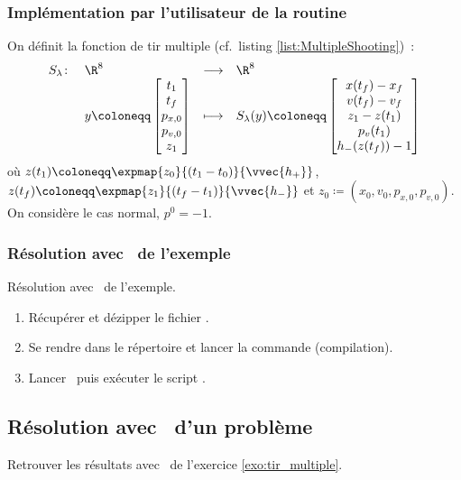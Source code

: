 \subsubsection{Impl\'ementation par l'utilisateur de la routine \fortran\ }
On d\'efinit la fonction de tir multiple (cf.\ listing \ref{list:MultipleShooting})~:
\begin{equation*}
    \begin{array}{rlcl}
        S_{\lambda} \colon & \R^8 & \longrightarrow   & \R^8 \\
        & y\coloneqq \begin{bmatrix}
            t_1     \\
            t_f     \\
            p_{x,0} \\
            p_{v,0} \\
            z_1
        \end{bmatrix}
        & \longmapsto       & \displaystyle S_{\lambda}(y) \coloneqq 
        \begin{bmatrix}
            x(t_f)  - x_f       \\
            v(t_f)  - v_f       \\
            z_1     - z(t_1)    \\
            p_v(t_1)            \\
            h_-(z(t_f)) - 1
        \end{bmatrix}
    \end{array}
\end{equation*}
o\`u $z(t_1) \coloneqq \expmap{z_0}{(t_1-t_0)}{\vvec{h_+}}$,
$z(t_f) \coloneqq \expmap{z_1}{(t_f-t_1)}{\vvec{h_-}}$
et $z_0 \coloneqq (x_0,v_0,p_{x,0},p_{v,0})$.
On consid\`ere le cas normal, \ie $p^0 = -1$.
%
\medskip
%


\subsubsection{R\'esolution avec \hampath\ de l'exemple}

\begin{myExercice} R\'esolution avec \hampath\ de l'exemple.
\begin{enumerate}
    \item R\'ecup\'erer et d\'ezipper le fichier .
    \item Se rendre dans le r\'epertoire  et lancer la commande  (compilation).
    \item Lancer \matlab\ puis ex\'ecuter le script .
\end{enumerate}
\end{myExercice}

\subsection{R\'esolution avec \hampath\ d'un probl\`eme}

\begin{myExercice}
    Retrouver les r\'esultats avec \hampath\ de l'exercice \ref{exo:tir_multiple}.
\end{myExercice}

